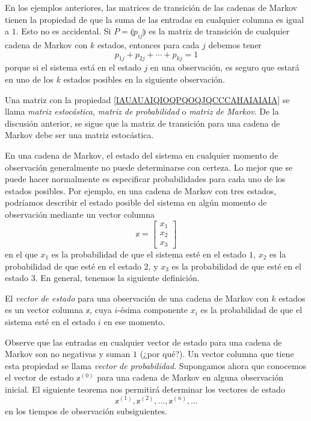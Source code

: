 En los ejemplos anteriores, las matrices de transición de las cadenas de Markov tienen la propiedad de que la suma de las entradas en cualquier columna es igual a $1$. Esto no es accidental. Si $P = \llparenthesis p_{ij} \rrparenthesis$ es la matriz de transición de cualquier cadena de Markov con $k$ estados, entonces para cada $j$ debemos tener
\begin{equation}
    p_{1j} + p_{2j} + \cdots + p_{kj} = 1 \label{IAUAUAIQIOQPQOQJQCCCAHAIAIAIA}
\end{equation}
porque si el sistema está en el estado $j$ en una observación, es seguro que estará en uno de los $k$ estados posibles en la siguiente observación.

Una matriz con la propiedad \eqref{IAUAUAIQIOQPQOQJQCCCAHAIAIAIA} se llama \emph{matriz estocástica}, \emph{matriz de probabilidad} o \emph{matriz de Markov}. De la discusión anterior, se sigue que la matriz de transición para una cadena de Markov debe ser una matriz estocástica.

En una cadena de Markov, el estado del sistema en cualquier momento de observación generalmente no puede determinarse con certeza. Lo mejor que se puede hacer normalmente es especificar probabilidades para cada uno de los estados posibles. Por ejemplo, en una cadena de Markov con tres estados, podríamos describir el estado posible del sistema en algún momento de observación mediante un vector columna
$$
\mathbb{x} = \begin{bmatrix}
    x_1 \\
    x_2 \\
    x_3
\end{bmatrix}
$$
en el que $x_1$ es la probabilidad de que el sistema esté en el estado $1$, $x_2$ es la probabilidad de que esté en el estado $2$, y $x_3$ es la probabilidad de que esté en el estado $3$. En general, tenemos la siguiente definición.

\begin{definition}
    El \emph{vector de estado} para una observación de una cadena de Markov con $k$ estados es un vector columna $\mathbb{x}$, cuya $i$-ésima componente $x_i$ es la probabilidad de que el sistema esté en el estado $i$ en ese momento.
\end{definition}

Observe que las entradas en cualquier vector de estado para una cadena de Markov son no negativas y suman $1$ (¿por qué?). Un vector columna que tiene esta propiedad se llama \emph{vector de probabilidad}. Supongamos ahora que conocemos el vector de estado $\mathbb{x}^{(0)}$ para una cadena de Markov en alguna observación inicial. El siguiente teorema nos permitirá determinar los vectores de estado
$$\mathbb{x}^{(1)}, \mathbb{x}^{(2)}, \dots, \mathbb{x}^{(n)}, \dots$$
en los tiempos de observación subsiguientes.


